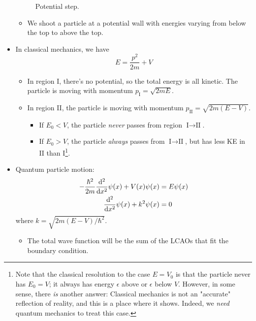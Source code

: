 \documentclass[../notes.tex]{subfiles}
\begin{document}
\begin{itemize}
\begin{figure}[h!]
        \caption{Potential step.}
        \label{fig:potentialStep}
    \end{figure}
    \begin{itemize}
        \item We shoot a particle at a potential wall with energies varying from below the top to above the top.
    \end{itemize}
    \item In classical mechanics, we have
    \begin{equation*}
        E = \frac{p^2}{2m}+V
    \end{equation*}
    \begin{itemize}
        \item In region I, there's no potential, so the total energy is all kinetic. The particle is moving with momentum $p_\text{I}=\sqrt{2mE}$.
        \item In region II, the particle is moving with momentum $p_\text{II}=\sqrt{2m(E-V)}$.
        \begin{itemize}
            \item If $E_0<V$, the particle \emph{never} passes from region $\text{I}\to\text{II}$.
            \item If $E_0>V$, the particle \emph{always} passes from $\text{I}\to\text{II}$, but has less KE in II than I\footnote{Note that the classical resolution to the case $E=V_0$ is that the particle never has $E_0=V$; it always has energy $\epsilon$ above or $\epsilon$ below $V$. However, in some sense, there \emph{is} another answer: Classical mechanics is not an "accurate" reflection of reality, and this is a place where it shows. Indeed, we \emph{need} quantum mechanics to treat this case.}.
        \end{itemize}
    \end{itemize}
    \item Quantum particle motion:
    \begin{align*}
        -\frac{\hbar^2}{2m}\dv[2]{x}\psi(x)+V(x)\psi(x) &= E\psi(x)\\
        \dv[2]{x}\psi(x)+k^2\psi(x) &= 0
    \end{align*}
    where $k=\sqrt{2m(E-V)/\hbar^2}$.
    \begin{itemize}
        \item The total wave function will be the sum of the LCAOs that fit the boundary condition.

\end{itemize}
\end{itemize}
\end{document}
